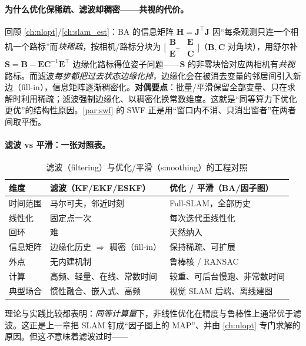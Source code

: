 \paragraph{为什么优化保稀疏、滤波却稠密——共视的代价。}
回顾 \cref{ch:nlopt}/\cref{ch:slam_est}：BA 的信息矩阵 $\mathbf{H}=\mathbf{J}^\top\mathbf{J}$ 因“每条观测只连一个相机一个路标”而\emph{块稀疏}，按相机/路标分块为 $\big[\begin{smallmatrix}\mathbf{B}&\mathbf{E}\\\mathbf{E}^\top&\mathbf{C}\end{smallmatrix}\big]$（$\mathbf{B},\mathbf{C}$ 对角块），用舒尔补 $\mathbf{S}=\mathbf{B}-\mathbf{E}\mathbf{C}^{-1}\mathbf{E}^\top$ 边缘化路标得位姿子问题——$\mathbf{S}$ 的非零块恰对应两相机有\emph{共视}路标。而滤波\emph{每步都把过去状态边缘化掉}，边缘化会在被消去变量的邻居间引入新边（fill-in），信息矩阵逐渐稠密化。\textbf{对偶要点}：批量/平滑保留全部变量、只在求解时利用稀疏；滤波强制边缘化、以稠密化换常数维度。这就是“同等算力下优化更优”的结构性原因。\cref{par:swf} 的 SWF 正是用“窗口内不消、只消出窗者”在两者间取平衡。

\paragraph{滤波 vs 平滑：一张对照表。}
\begin{table}[ht]\centering\small
\caption{滤波（filtering）与优化/平滑（smoothing）的工程对照}
\label{tab:filter-vs-opt}
\begin{tabular}{lll}
\toprule
维度 & 滤波（KF/EKF/ESKF） & 优化 / 平滑（BA/因子图） \\
\midrule
时间范围 & 马尔可夫，邻近时刻 & Full-SLAM，全部历史 \\
线性化 & 固定点一次 & 每次迭代重线性化 \\
回环 & 难 & 天然纳入 \\
信息矩阵 & 边缘化历史 $\Rightarrow$ 稠密（fill-in） & 保持稀疏、可扩展 \\
外点 & 无内建机制 & 鲁棒核 / RANSAC \\
计算 & 高频、轻量、在线、常数时间 & 较重、可后台慢跑、非常数时间 \\
典型场合 & 惯性融合、嵌入式、高频 & 视觉 SLAM 后端、离线建图 \\
\bottomrule
\end{tabular}
\end{table}

\noindent 理论与实践比较都表明：\emph{同等计算量}下，非线性优化在精度与鲁棒性上通常优于滤波\cite{gaoxiang2019slam14,carlone2026handbook}。这正是上一章把 SLAM 钉成“因子图上的 MAP”、并由 \cref{ch:nlopt} 专门求解的原因。但这\emph{不}意味着滤波过时——

